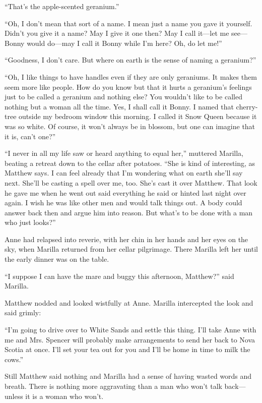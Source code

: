 \documentclass[a4paper]{article}
\begin{document}
``That's the apple-scented geranium.''

``Oh, I don't mean that sort of a name. I mean just a name you gave it yourself. Didn't you give it a name? May I give it one then? May I call it---let me see---Bonny would do---may I call it Bonny while I'm here? Oh, do let me!''

``Goodness, I don't care. But where on earth is the sense of naming a geranium?''

``Oh, I like things to have handles even if they are only geraniums. It makes them seem more like people. How do you know but that it hurts a geranium's feelings just to be called a geranium and nothing else? You wouldn't like to be called nothing but a woman all the time. Yes, I shall call it Bonny. I named that cherry-tree outside my bedroom window this morning. I called it Snow Queen because it was so white. Of course, it won't always be in blossom, but one can imagine that it is, can't one?''

``I never in all my life saw or heard anything to equal her,'' muttered Marilla, beating a retreat down to the cellar after potatoes. ``She is kind of interesting, as Matthew says. I can feel already that I'm wondering what on earth she'll say next. She'll be casting a spell over me, too. She's cast it over Matthew. That look he gave me when he went out said everything he said or hinted last night over again. I wish he was like other men and would talk things out. A body could answer back then and argue him into reason. But what's to be done with a man who just looks?''

Anne had relapsed into reverie, with her chin in her hands and her eyes on the sky, when Marilla returned from her cellar pilgrimage. There Marilla left her until the early dinner was on the table.

``I suppose I can have the mare and buggy this afternoon, Matthew?'' said Marilla.

Matthew nodded and looked wistfully at Anne. Marilla intercepted the look and said grimly:

``I'm going to drive over to White Sands and settle this thing. I'll take Anne with me and Mrs. Spencer will probably make arrangements to send her back to Nova Scotia at once. I'll set your tea out for you and I'll be home in time to milk the cows.''

Still Matthew said nothing and Marilla had a sense of having wasted words and breath. There is nothing more aggravating than a man who won't talk back---unless it is a woman who won't.
\end{document}
